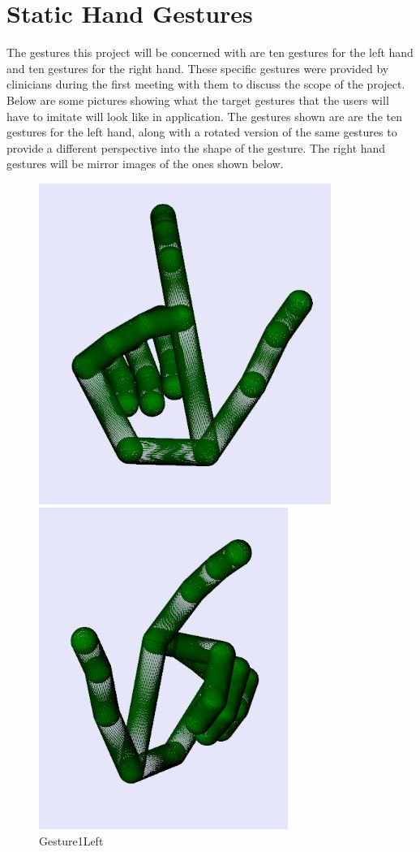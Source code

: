 \section{Static Hand Gestures}
The gestures this project will be concerned with are ten gestures for the left hand and ten gestures for the right hand. These specific gestures were provided by clinicians during the first meeting with them to discuss the scope of the project. Below are some pictures showing what the target gestures that the users will have to imitate will look like in application. The gestures shown are are the ten gestures for the left hand, along with a rotated version of the same gestures to provide a different perspective into the shape of the gesture. The right hand gestures will be mirror images of the ones shown below. 
\begin{figure}[H]
    \centering
    \begin{minipage}{0.5\textwidth}
        \centering
        \includegraphics[scale=.75]{Figures/gesture1Left.JPG} 
        \caption[Gesture1Left]{Gesture1Left}
		\label{fig:Gesture1Left}
    \end{minipage}\hfill
    \begin{minipage}{0.5\textwidth}
        \centering
        \includegraphics[scale=.7]{Figures/gesture1Left_rotated.JPG}

\end{minipage}
\end{figure}
